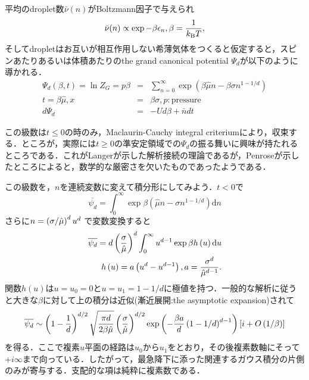 \documentclass[a4j,10pt]{jarticle}
\begin{document}
平均のdroplet数$\bar{\nu}(n)$がBoltzmann因子で与えられ
\begin{equation}
\bar{\nu}(n) \propto \exp{-\beta \epsilon_n}, \beta=\frac{1}{k_{\rm B}T},
\end{equation}
そしてdropletはお互いが相互作用しない希薄気体をつくると仮定すると，スピンあたりあるいは体積あたりのthe grand canonical potential $\Psi_d$が以下のように導かれる．
\begin{eqnarray}
\Psi_d(\beta, t) = \ln Z_G = p \beta &=&
 \sum_{n=0}^{\infty}\exp\left(\beta \hat{\mu} n-\beta\sigma n^{1-1/d}\right) \\ 
t=\beta \hat{\mu}, x&=&\beta \sigma, p:\textrm{pressure} \nonumber \\
d \Psi_d &=& - U d\beta + \bar{n} dt
\end{eqnarray}

この級数は$t \leq 0$の時のみ，Maclaurin-Cauchy integral criteriumにより，収束する．ところが，実際には$t \geq 0$の準安定領域での$\Psi_d$の振る舞いに興味が持たれるところである．これがLangerが示した解析接続の理論であるが，Penroseが示したところによると，数学的な厳密さを欠いたものであったようである．

この級数を，$n$を連続変数に変えて積分形にしてみよう．$t < 0$で
\begin{equation}
\overline {\psi _d}=\int_0^\infty  {\exp \beta \left( {\hat \mu n-\sigma n^{1-1/d}} \right)\textrm{d}n}
\end{equation}
さらに$n=\left( {{\sigma  \mathord{\left/ {\vphantom {\sigma  {\hat \mu }}} \right. \kern-\nulldelimiterspace} {\hat \mu }}} \right)^d u^d$
で変数変換すると
\begin{eqnarray}
\overline {\psi _d}=d\left( {{\sigma  \over {\hat \mu }}} \right)^d\int_0^\infty  {u^{d-1}\exp \beta h\left( u \right)\textrm{d}u}
\\
h\left( u \right)=a\left( {u^d-u^{d-1}} \right),a={{\sigma ^d} \over {\hat \mu ^{d-1}}}. \nonumber
\end{eqnarray}
関数$h(u)$は$u=u_0=0$と$u=u_1=1-1/d$に極値を持つ．一般的な解析に従うと大きな$\beta$に対して上の積分は近似(漸近展開:the asymptotic expansion)されて
\begin{equation}
\overline {\psi _d}\sim \left( {1-{1 \over d}} \right)^{{d \mathord{\left/ {\vphantom {d 2}} \right. \kern-\nulldelimiterspace} 2}}\sqrt {{{\pi d} \over {2\beta \hat \mu }}}\left( {{\sigma  \over {\hat \mu }}} \right)^{{d \mathord{\left/ {\vphantom {d 2}} \right. \kern-\nulldelimiterspace} 2}}\exp \left( {-{{\beta a} \over d}\left( {1-1/d} \right)^{d-1}} \right)\left[ {i+O\left( {1/\beta } \right)} \right]
\end{equation}
を得る．ここで複素$u$平面の経路は$u_0$から$u_1$をとおり，その後複素数軸にそって$+i\infty$まで向っている．したがって，最急降下に添った関連するガウス積分の片側のみが寄与する．支配的な項は純粋に複素数である．
\end{document}
